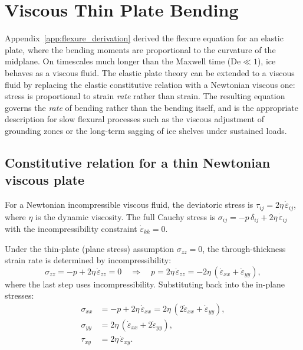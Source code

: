 \documentclass[11pt]{article}
\begin{document}
\section{Viscous Thin Plate Bending}
\label{app:viscous_plate}

Appendix~\ref{app:flexure_derivation} derived the flexure equation for an elastic plate, where the bending moments are proportional to the curvature of the midplane.  On timescales much longer than the Maxwell time ($\text{De} \ll 1$), ice behaves as a viscous fluid.  The elastic plate theory can be extended to a viscous fluid by replacing the elastic constitutive relation with a Newtonian viscous one: stress is proportional to strain \textit{rate} rather than strain.  The resulting equation governs the \textit{rate} of bending rather than the bending itself, and is the appropriate description for slow flexural processes such as the viscous adjustment of grounding zones or the long-term sagging of ice shelves under sustained loads.

\subsection*{Constitutive relation for a thin Newtonian viscous plate}

For a Newtonian incompressible viscous fluid, the deviatoric stress is $\tau_{ij} = 2\eta\,\dot{\varepsilon}_{ij}$, where $\eta$ is the dynamic viscosity.  The full Cauchy stress is $\sigma_{ij} = -p\,\delta_{ij} + 2\eta\,\dot{\varepsilon}_{ij}$ with the incompressibility constraint $\dot{\varepsilon}_{kk} = 0$.

\medskip
\noindent Under the thin-plate (plane stress) assumption $\sigma_{zz} = 0$, the through-thickness strain rate is determined by incompressibility:
\begin{equation}
  \sigma_{zz} = -p + 2\eta\,\dot{\varepsilon}_{zz} = 0 \quad \Longrightarrow \quad p = 2\eta\,\dot{\varepsilon}_{zz} = -2\eta\,(\dot{\varepsilon}_{xx} + \dot{\varepsilon}_{yy}),
  \label{eq:viscous_plane_stress}
\end{equation}
where the last step uses incompressibility.  Substituting back into the in-plane stresses:
\begin{align}
  \sigma_{xx} &= -p + 2\eta\,\dot{\varepsilon}_{xx} = 2\eta\,(2\dot{\varepsilon}_{xx} + \dot{\varepsilon}_{yy}), \nonumber \\[2pt]
  \sigma_{yy} &= 2\eta\,(\dot{\varepsilon}_{xx} + 2\dot{\varepsilon}_{yy}), \nonumber \\[2pt]
  \tau_{xy} &= 2\eta\,\dot{\varepsilon}_{xy}.
  \label{eq:viscous_plane_stress_components}
\end{align}
\end{document}
